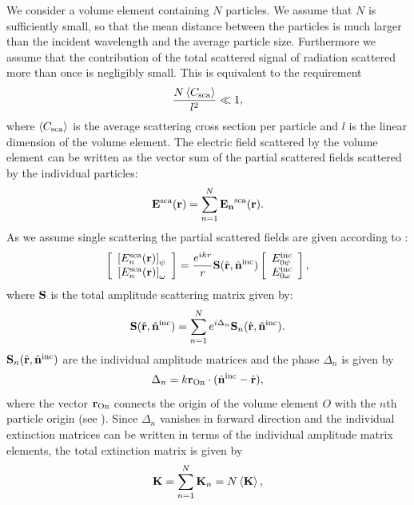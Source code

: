 We consider a volume element containing $N$ particles. We assume that
$N$ is sufficiently small, so that the mean distance between the
particles is much larger than the incident wavelength and the average
particle size. Furthermore we assume that the contribution of the
total scattered signal of radiation scattered more than once is
negligibly small.  This is equivalent to the requirement
\begin{equation}
  \frac{N\left\langle C_{\mathrm{sca}} \right\rangle}{l^2} \ll 1,
\end{equation}
where $\left\langle C_{\mathrm{sca}} \right\rangle$ is the average scattering cross section per
particle and $l$ is the linear dimension of the volume element.  The
electric field scattered by the volume element can be written as the
vector sum of the partial scattered fields scattered by the individual
particles:
\begin{equation}
  \mathbf{E}^{\mathrm{sca}}(\mathbf{r}) = \sum_{n=1}^{N}\mathbf{E_n}^{\mathrm{sca}}(\mathbf{r}).
\end{equation}
As we assume single scattering the partial scattered fields are given
according to :
\begin{equation}
  \ColVctTwo{\left[ E_n^{\sca}(\VctStl{r}) \right]_\ZntAng}%
         {\left[ E_n^{\sca}(\VctStl{r})\right]_\AzmAng}
         = \frac{e^{ikr}}{r}{\MtrStl{S}(\hat{\VctStl{r}},\hat{\VctStl{n}}^{\inc})} 
 \ColVctTwo{E_{0\ZntAng}^{\inc}}%
         {E_{0\AzmAng}^{\inc}},
\end{equation}
where $\mathbf{S}$ is the total amplitude scattering matrix given by:
\begin{equation}
  \mathbf{S}(\hat{\mathbf{r}},\hat{\mathbf{n}}^{\mathrm{inc}}) = \sum_{n=1}^N e^{i\Delta_n}  {\mathbf{S}_n(\hat{\mathbf{r}},\hat{\mathbf{n}}^{\mathrm{inc}})}.
\end{equation}
$\mathbf{S}_n(\hat{\mathbf{r}},\hat{\mathbf{n}}^{\mathrm{inc}})$ are the individual amplitude
matrices and the phase $\Delta_n$ is given by
\begin{equation}
  \Delta_n = k \mathbf{r}_\mathrm{On} \cdot(\hat{\mathbf{n}}^{\mathrm{inc}} - \hat{\mathbf{r}}),
\end{equation}
where the vector $\mathbf{r}_\mathrm{On}$ connects the origin of the volume
element $O$ with the $n$th particle origin (see
).  Since $\Delta_n$ vanishes in forward
direction and the individual extinction matrices can be written in
terms of the individual amplitude matrix elements, the total
extinction matrix is given by
\begin{equation}
  \label{eq:rtetheory:ext_mat_tot}
  {\bf K} = \sum_{n=1}^N  \mathbf{K}_n = N \left\langle {\bf K} \right\rangle,
\end{equation}
